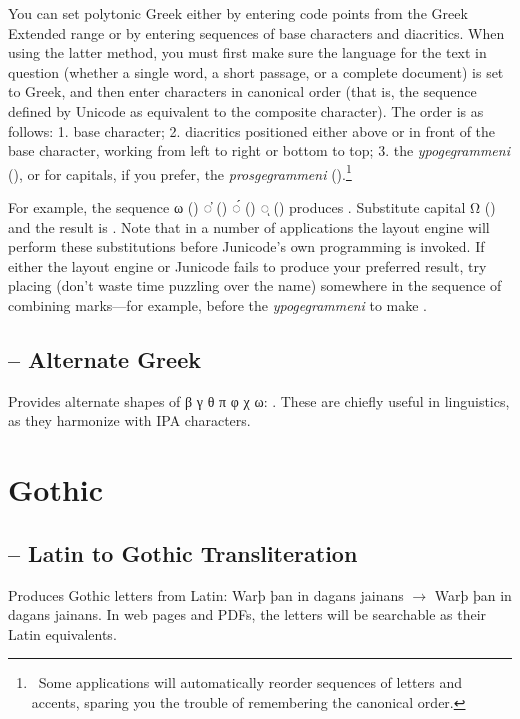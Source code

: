 You can set polytonic Greek either by entering code points from the Greek
Extended range or by entering sequences of base characters and diacritics.
When using the latter method, you must first make sure the language for the
text in question (whether a single word, a short passage, or a complete
document) is set to Greek, and then enter characters in canonical order
(that is, the sequence defined by Unicode as equivalent to the composite
character). The order is as follows: 1. base character; 2. diacritics
positioned either above or in front of the base character, working from left
to right or bottom to top; 3. the \textit{ypogegrammeni} (), or for
capitals, if you prefer, the \textit{prosgegrammeni} ().\footnote{\ Some
applications will automatically reorder sequences of letters and accents,
sparing you the trouble of remembering the canonical order.}

For example, the sequence ω () ◌̓ () ◌́ () ◌ͅ ()
produces .
Substitute capital Ω () and the result is
. Note that in a number of applications the layout
engine will perform these substitutions before Junicode’s own programming is
invoked. If either the layout engine or Junicode fails to produce your
preferred result, try placing  
(don't waste time puzzling over the name) somewhere
in the sequence of combining marks—for example, before the \textit{ypogegrammeni}
to make .

\subsection{ – Alternate Greek}
Provides alternate shapes of {β γ θ π φ χ ω}:
.
These are chiefly useful in linguistics, as they harmonize with IPA characters.

\section{Gothic}
\subsection{ – Latin to Gothic Transliteration}
Produces Gothic letters from Latin: {Warþ þan in dagans jainans} $\rightarrow $
{\LatinToGothic{}Warþ þan in dagans
jainans}. In web pages and PDFs, the letters will be searchable as their Latin equivalents.

